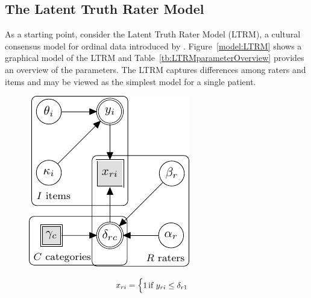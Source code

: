 \documentclass[a4paper,usenames,dvipsnames]{article}
\newenvironment{revision}{\color{black}}{\color{black}}
\begin{document}
\subsection*{The Latent Truth Rater Model}
As a starting point, consider the Latent Truth Rater Model (LTRM), a cultural consensus model for ordinal data introduced by \AB{}. Figure~\ref{model:LTRM} shows a graphical model of the LTRM \begin{revision}and Table~\ref{tb:LTRMparameterOverview} provides an overview of the parameters\end{revision}. The LTRM captures differences among raters and items and may be viewed as the simplest model for a single patient.
\begin{figure}[!ht]
	\begin{minipage}{0.5\textwidth}
		\centering
		\includegraphics[width=\textwidth, page=7]{graphicalModels/graphicalModels.pdf}
		\end{minipage}\hfill
	\begin{minipage}{0.5\textwidth}
		{\normalsize
		\begin{align*}
			x_{\Irater\Iitem} &\assignment
			\begin{cases}
			1		&\hspace{-.3cm} \text{if } \Appraisal_{\Irater\Iitem} \leq \Threshold_{\Irater 1} \\

\end{cases}
\end{align*}}
\end{minipage}
\end{figure}
\end{document}
